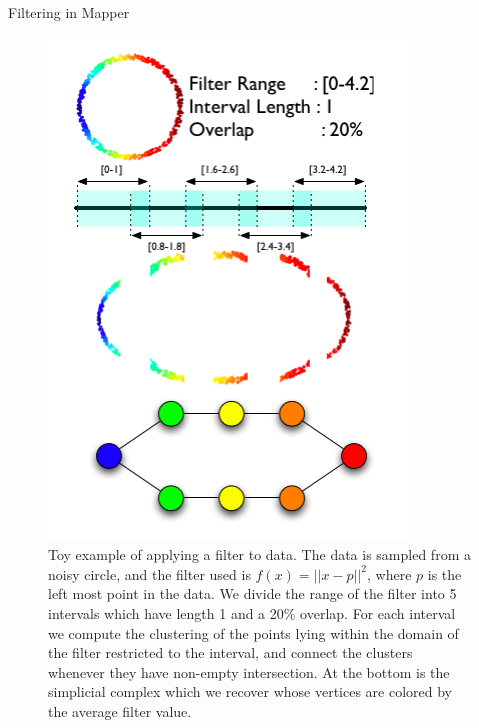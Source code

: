 \documentclass[handout]{beamer}
\begin{document}
\begin{frame}{Filtering in Mapper}
    \begin{figure}
        \begin{columns}
            \begin{column}{0.4\textwidth}
                \includegraphics[width = \linewidth]{filter.png}
            \end{column}
            \begin{column}{0.55\textwidth}
                \caption{Toy example of applying a filter to data\cite{mapper}. The data is sampled from a noisy circle, and the filter used is $f(x) = ||x - p||^2$, where $p$ is the left most point in the data. We divide the range of the filter into 5 intervals which have length 1 and a 20$\%$ overlap. For each interval we compute the clustering of the points lying within the domain of the filter restricted to the interval, and connect the clusters whenever they have non-empty intersection. At the bottom is the simplicial complex which we recover whose vertices are colored by the average filter value.}
            \end{column}
        \end{columns}
    \end{figure}
\end{frame}
\end{document}
